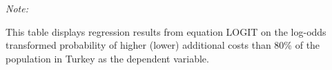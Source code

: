 \begin{table}[htbp!]
\begin{adjustbox}{width = 1\textwidth, max height = 0.95\textheight, center}
\begin{threeparttable}[b]
         \begin{tablenotes}\item \medskip \textit{Note:}
            \item This table displays regression results from equation LOGIT on the log-odds transformed probability of higher (lower) additional costs than 80\% of the population in Turkey as the dependent variable. 
         \end{tablenotes}
      \end{threeparttable}
   \end{adjustbox}
\end{table}



